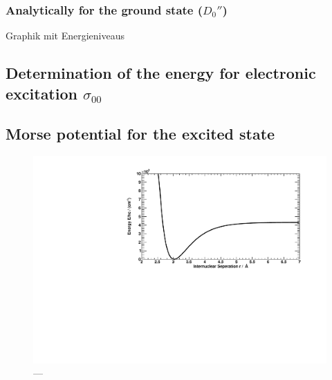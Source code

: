 \subsubsection{Analytically for the ground state ($D_0''$)}

Graphik mit Energieniveaus

\subsection{Determination of the energy for electronic excitation $\sigma_{00}$}

\subsection{Morse potential for the excited state}


\begin{figure}[H]
\begin{center}
  \includegraphics[width=\textwidth]{../img/morse.pdf}
  \caption[---]{---}
  \label{img:morse}
\end{center}
\end{figure}


